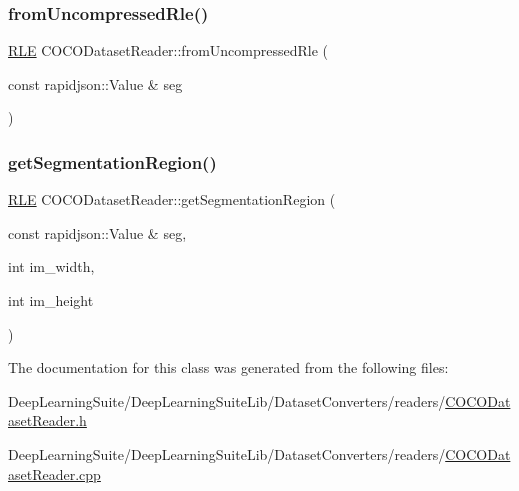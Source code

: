 \mbox{\label{class_c_o_c_o_dataset_reader_ad3dc79ff171b5df8677a0a66a5f97ebd}} 
\subsubsection{\texorpdfstring{from\+Uncompressed\+Rle()}{fromUncompressedRle()}}
{\footnotesize\ttfamily \hyperlink{struct_r_l_e}{R\+LE} C\+O\+C\+O\+Dataset\+Reader\+::from\+Uncompressed\+Rle (\begin{DoxyParamCaption}\item[{const rapidjson\+::\+Value \&}]{seg }\end{DoxyParamCaption})}

\mbox{\label{class_c_o_c_o_dataset_reader_a2fcb9bb8c21783596a9c77efb49ca509}} 
\subsubsection{\texorpdfstring{get\+Segmentation\+Region()}{getSegmentationRegion()}}
{\footnotesize\ttfamily \hyperlink{struct_r_l_e}{R\+LE} C\+O\+C\+O\+Dataset\+Reader\+::get\+Segmentation\+Region (\begin{DoxyParamCaption}\item[{const rapidjson\+::\+Value \&}]{seg,  }\item[{int}]{im\+\_\+width,  }\item[{int}]{im\+\_\+height }\end{DoxyParamCaption})}



The documentation for this class was generated from the following files\+:\begin{DoxyCompactItemize}
\item 
Deep\+Learning\+Suite/\+Deep\+Learning\+Suite\+Lib/\+Dataset\+Converters/readers/\hyperlink{_c_o_c_o_dataset_reader_8h}{C\+O\+C\+O\+Dataset\+Reader.\+h}\item 
Deep\+Learning\+Suite/\+Deep\+Learning\+Suite\+Lib/\+Dataset\+Converters/readers/\hyperlink{_c_o_c_o_dataset_reader_8cpp}{C\+O\+C\+O\+Dataset\+Reader.\+cpp}\end{DoxyCompactItemize}
